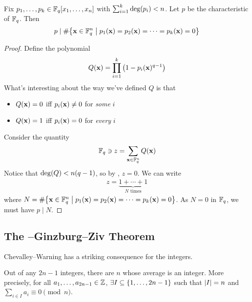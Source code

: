 \begin{boxtheorem}
    Fix $p_1, \ldots, p_k \in \mathbb{F}_q\!\left[ x_1, \ldots, x_n \right]$ with $\sum_{i=1}^{k} \deg\!\left( p_i \right) < n$. Let $p$ be the characteristic of $\mathbb{F}_q$. Then
    \begin{align*}
        p \mid \#\!\left\{ \mathbf{x} \in \mathbb{F}_q^n \; \middle\vert \; p_1\!\left( \mathbf{x} \right) = p_2\!\left( \mathbf{x} \right) = \cdots = p_k\!\left( \mathbf{x} \right) = 0 \right\}
    \end{align*}
\end{boxtheorem}
\begin{proof}
    Define the polynomial
    \begin{align*}
        Q(\mathbf{x}) = \prod_{i=1}^{k} \left( 1 - p_i(\mathbf{x})^{q - 1} \right)
    \end{align*}
    What's interesting about the way we've defined $Q$ is that
    \begin{itemize}
        \item $Q(\mathbf{x}) = 0$ iff $p_i(\mathbf{x}) \ne 0$ for \textit{some} $i$
        \item $Q(\mathbf{x}) = 1$ iff $p_i(\mathbf{x}) = 0$ for \textit{every} $i$
    \end{itemize}
    Consider the quantity
    \begin{align*}
        \mathbb{F}_q \ni z = \sum_{\mathbf{x} \in \mathbb{F}_q^n} Q(\mathbf{x})
    \end{align*}
    Notice that $\deg\!\left( Q \right) < n(q - 1)$, so by , 
    $z = 0$. We can write
    \begin{align*}
        z = \underbrace{1 + \cdots + 1}_{N \text{ times}}
    \end{align*}
    where $N = \#\!\left\{ \mathbf{x} \in \mathbb{F}_q^n \; \middle\vert \; p_1\!\left( \mathbf{x} \right) = p_2\!\left( \mathbf{x} \right) = \cdots = p_k\!\left( \mathbf{x} \right) = 0 \right\}$. As $N = 0$ in $\mathbb{F}_q$, we must have $p \mid N$.
\end{proof}

\subsection{The \protect\Erdos--Ginzburg--Ziv Theorem}

Chevalley--Warning has a striking consequence for the integers.

\begin{boxtheorem}
    Out of any $2n - 1$ integers, there are $n$ whose average is an integer. More precisely, for all $a_1, \ldots, a_{2n - 1} \in \mathbb{Z}$, $\exists I \subseteq \left\{ 1, \ldots, 2n - 1 \right\}$ such that $\left\lvert I \right\rvert = n$ and $\sum_{i \in I} a_i \equiv 0 \pmod{n}$.
\end{boxtheorem}

